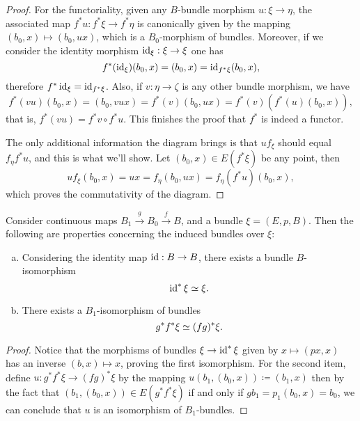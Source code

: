 \documentclass[../../../deep-dive]{subfile}
\begin{document}
\begin{proof}
For the functoriality, given any \(B\)-bundle morphism \(u: \xi \to \eta\), the
associated map \(f^{*} u: f^{*} \xi \to f^{*} \eta\) is canonically given by the
mapping \((b_0, x) \mapsto (b_0, u x)\), which is a \(B_0\)-morphism of
bundles. Moreover, if we consider the identity morphism \(\operatorname{id}_{\xi}: \xi \to
\xi\) one has
\[
f^{*}(\operatorname{id}_{\xi})(b_0, x) = (b_0, x) = \operatorname{id}_{f^{*} \xi}(b_0, x),
\]
therefore \(f^{*} \operatorname{id}_{\xi} = \operatorname{id}_{f^{*} \xi}\). Also, if \(v: \eta \to \zeta\)
is any other bundle morphism, we have
\[
f^{*}(v u)(b_0, x)
= (b_0, v u x)
= f^{*}(v)(b_0, u x)
= f^{*}(v)(f^{*}(u)(b_0, x)),
\]
that is, \(f^{*}(v u) = f^{*} v \circ f^{*} u\). This finishes the proof that
\(f^{*}\) is indeed a functor.

The only additional information the diagram brings is that \(u f_{\xi}\) should
equal \(f_{\eta} f^{*} u\), and this is what we'll show. Let \((b_0, x) \in
E(f^{*} \xi)\) be any point, then
\[
u f_{\xi} (b_0, x)
= u x
= f_{\eta}(b_0, u x)
= f_{\eta} (f^{*} u) (b_0, x),
\]
which proves the commutativity of the diagram.
\end{proof}

\begin{proposition}
\label{prop:induced-bundle-functorial-transitivity}
Consider continuous maps \(B_1 \xrightarrow g B_0 \xrightarrow f B\), and a
bundle \(\xi = (E, p, B)\). Then the following are properties concerning the
induced bundles over \(\xi\):
\begin{enumerate}[(a)]\setlength\itemsep{0em}
\item Considering the identity map \(\operatorname{id}: B \to B\), there exists a bundle
  \(B\)-isomorphism
  \[
  \operatorname{id}^{*} \xi \simeq \xi.
  \]

\item There exists a \(B_1\)-isomorphism of bundles
  \[
  g^{*} f^{*} \xi \simeq (f g)^{*} \xi.
  \]
\end{enumerate}
\end{proposition}

\begin{proof}
Notice that the morphisms of bundles \(\xi \to \operatorname{id}^{*} \xi\) given by
\(x \mapsto (p x, x)\) has an inverse \((b, x) \mapsto x\), proving the first
isomorphism. For the second item, define
\(u: g^{*} f^{*} \xi \to (f g)^{*} \xi\) by the mapping
\(u(b_1, (b_0, x)) \coloneq (b_1, x)\) then by the fact that
\((b_1, (b_0, x)) \in E (g^{*} f^{*} \xi)\) if and only if
\(g b_1 = p_1(b_0, x) = b_0\), we can conclude that \(u\) is an isomorphism of
\(B_1\)-bundles.
\end{proof}
\end{document}
